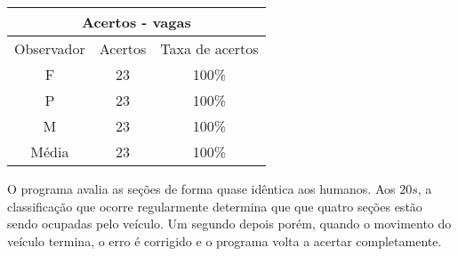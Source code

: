 \begin{center}
\begin{tabular}{|c||c||c|}
\hline
\multicolumn{3}{|c|}{Acertos - vagas}  \\ \hline \hline
Observador & Acertos & Taxa de acertos \\ \hline
F & 23 & 100\% \\  \hline
P & 23 & 100\% \\ \hline
M & 23 & 100\% \\ \hline
Média & 23 & 100\% \\
\hline
\end{tabular}
\end{center}

O programa avalia as seções de forma quase idêntica aos humanos. Aos $20s$, a classificação que ocorre regularmente determina que que quatro seções estão sendo ocupadas pelo veículo. Um segundo depois porém, quando o movimento do veículo termina, o erro é corrigido e o programa volta a acertar completamente.












